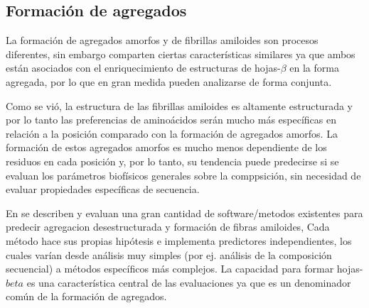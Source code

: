\subsection{Formación de agregados}
\label{agregados}




La formación de agregados amorfos y de fibrillas amiloides son procesos diferentes, sin embargo comparten ciertas características similares ya que ambos están asociados con el enriquecimiento de estructuras de hojas-$\beta$ 
en la forma agregada, por lo que en gran medida pueden analizarse de forma conjunta.

Como se vió, la estructura de las fibrillas amiloides es altamente estructurada y por lo tanto las preferencias de aminoácidos serán mucho más específicas en relación a la posición comparado con la formación de agregados amorfos.
La formación de estos agregados amorfos es mucho menos dependiente de los residuos en cada posición y, por lo tanto, su tendencia puede predecirse si se evaluan los parámetros biofísicos generales sobre la comppsición, sin necesidad de 
evaluar propiedades específicas de secuencia.


En \cite{hamodrakas2011protein,redler2014computational,agrawal2011aggregation} se describen y evaluan una gran cantidad de software/metodos existentes para predecir agregacion desestructurada y formación de fibras amiloides, 
Cada método hace sus propias hipótesis e implementa predictores independientes, los cuales varían desde análisis muy simples (por ej. análisis de la composición secuencial) a métodos específicos más complejos.
La capacidad para formar hojas-$beta$ es una característica central de las evaluaciones ya que es un denominador común de la formación de agregados.




